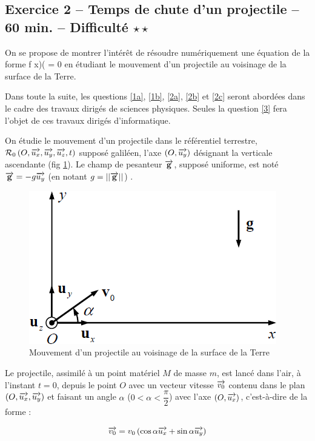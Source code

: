 \documentclass[10pt,oneside]{article}
\begin{document}
\subsection*{Exercice 2 -- Temps de chute d'un projectile -- 60 min. -- Difficulté $\star\star$}
 
\setcounter{subparagraph}{0}
\setcounter{equation}{0}
On se propose de montrer l’intérêt de résoudre numériquement une équation de la forme f x)( = 0 en 
étudiant le mouvement d’un projectile au voisinage de la surface de la Terre. 
\begin{rem}

Dans toute la suite, les questions \ref{1a}, \ref{1b}, \ref{2a}, \ref{2b} et \ref{2c} seront abordées dans le cadre des travaux 
dirigés de sciences physiques. Seules la question \ref{3} fera l’objet de ces travaux dirigés 
d’informatique. 

\end{rem}

On étudie le mouvement d’un projectile dans le référentiel terrestre, $\mathcal{R}_0\left(O, \overrightarrow{u_x}, \overrightarrow{u_y}, \overrightarrow{u_z}, t \right)$ supposé galiléen, l’axe $\left( O, \overrightarrow{u_y}\right)$
 désignant la verticale ascendante (fig \ref{fig1}). Le champ de pesanteur $\overrightarrow{\mathbf{g}}$, supposé 
uniforme, est noté $\overrightarrow{\mathbf{g}} = -g\overrightarrow{u_y}$ (en notant $g = ||\overrightarrow{\mathbf{g}}||$) .

\begin{figure}[!ht]
\centering
\includegraphics[width=.4\textwidth]{images/fig1}
\caption{Mouvement d'un projectile au voisinage de la surface de la Terre}
\label{fig1}
\end{figure}

Le projectile, assimilé à un point matériel $M$ de masse $m$, est lancé dans l’air, à l’instant $t = 0 $, depuis le
point $O$ avec un vecteur vitesse $\overrightarrow{v_0}$ contenu dans le plan $\left(O,\overrightarrow{u_x},\overrightarrow{u_y}\right)$ et faisant un angle $\alpha$ ($0<\alpha<\dfrac{\pi}{2}$) avec l'axe $(O,\overrightarrow{u_x})$, c'est-à-dire de la forme : 

\begin{equation}
\overrightarrow{v_0} = v_0\left(\cos\alpha \overrightarrow{u_x} + \sin\alpha \overrightarrow{u_y}\right)
\end{equation}
\end{document}
